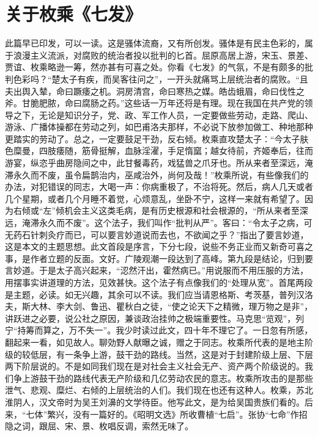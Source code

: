 \section[关于枚乘《七发》（一九五九年八月十六日）]{关于枚乘《七发》}


此篇早已印发，可以一读。这是骚体流裔，又有所创发。骚体是有民主色彩的，属于浪漫主义流派，对腐败的统治者投以批判的匕首。屈原高居上游，宋玉、景差、贾谊、枚乘略逊一筹，然亦甚有可喜之处。你看《七发》的气氛，不是有颇多的批判色彩吗？“楚太子有疾，而吴客往问之”，一开头就痛骂上层统治者的腐败。“且夫出舆入辇，命曰蹶痿之机。洞房清宫，命曰寒热之媒。皓齿蛾眉，命曰伐性之斧。甘脆肥脓，命曰腐肠之药。”这些话一万年还将是有理。现在我国在共产党的领导之下，无论是知识分子，党、政、军工作人员，一定要做些劳动，走路、爬山、游泳、广播体操都在劳动之列，如巴甫洛夫那样，不必说下放参加做工、种地那种更踏实的劳动了。总之，一定要鼓足干劲，反右倾。枚乘直攻楚太子：“今太子肤色糜曼，四肢痿随，筋骨挺解，血脉淫濯，手足惰窳；越女待前，齐姬奉后，往而游宴，纵恣乎曲房隐间之中，此甘餐毒药，戏猛兽之爪牙也。所从来者至深远，淹滞永久而不废，虽令扁鹊治内，巫咸治外，尚何及哉！”枚乘所说，有些像我们的办法，对犯错误的同志，大喝一声：你病重极了，不治将死。然后，病人几天或者几个星期，或者几个月睡不着觉，心烦意乱，坐卧不宁，这样一来就有希望了。因为右倾或“左”倾机会主义这类毛病，是有历史根源和社会根源的，“所从来者至深远，淹滞永久而不废”。这个法子，我们叫作“批判从严”。客曰：“令太子之病，可无药石针刺灸疗而已，可以要言妙道说而去也，不欲闻之乎？”指出了要言妙道，这是本文的主题思想。此文首段是序言，下分七段，说些不务正业而又新奇可喜之事，是作者立题的反面。文好。广陵观潮一段达到了高峰。第九段是结论，归到要言妙道。于是太子高兴起来，“涊然汗出，霍然病已。”用说服而不用压服的方法，用摆事实讲道理的方法，见效甚快。这个法子有点像我们的“处理从宽”。首尾两段是主题，必读。如无兴趣，其余可以不读。我们应当请恩格斯、考茨基，普列汉洛夫，斯大林、李大剑、鲁迅、瞿秋白之徒，“使之论天下之精微，理万物之是非”，讲跃进之必要，说公社之原因，兼谈政治挂帅之极端重要性。马克思“览观”，列宁“持筹而算之，万不失一”。我少时读过此文，四十年不理它了。一日忽有所感，翻起来一看，如见故人。聊効野人献曝之诚，赠之于同志。枚乘所代表的是地主阶级的较低层，有一条争上游，鼓干劲的路线。当然，这是对于封建阶级上层、下层两下阶层说的。不是如同我们现在是对社会主义社会无产、资产两个阶级说的。我们争上游鼓干劲的路线代表无产阶级和几亿劳动农民的意志。枚乘所攻击的是那些泄气、悲观、糜烂、右倾的上层统治的人们。我们现在也还有这种人。枚乘，苏北淮阴人，汉文帝时为吴王刘濞的文学待臣。他写此文，是为给吴国贵族们看的。后来，“七体”繁兴，没有一篇好的。《昭明文选》所收曹植“七启”。张协“七命”作招隐之词，跟屈、宋、景、枚唱反调，索然无味了。


